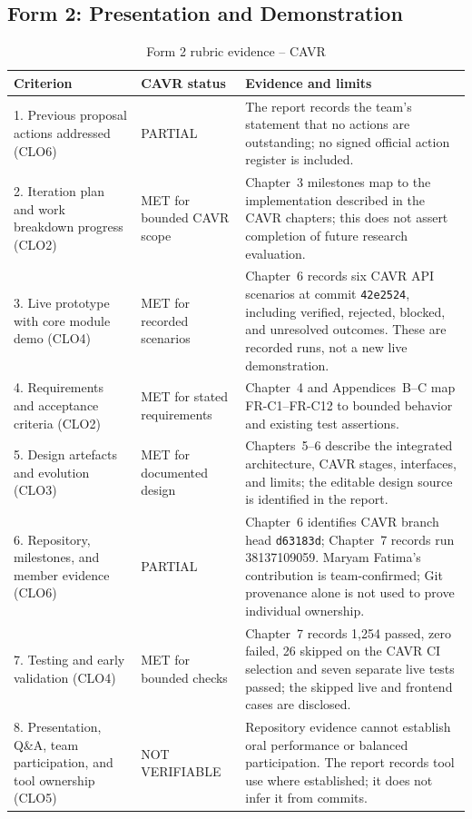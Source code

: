 \subsection{Form 2: Presentation and Demonstration}
\small
\begin{longtable}{p{}p{}p{}}
\caption{Form 2 rubric evidence -- CAVR}\\
\toprule
\textbf{Criterion} & \textbf{CAVR status} & \textbf{Evidence and limits}\\
\midrule
1. Previous proposal actions addressed (CLO6) & PARTIAL & The report records the team's statement that no actions are outstanding; no signed official action register is included.\\
2. Iteration plan and work breakdown progress (CLO2) & MET for bounded CAVR scope & Chapter~3 milestones map to the implementation described in the CAVR chapters; this does not assert completion of future research evaluation.\\
3. Live prototype with core module demo (CLO4) & MET for recorded scenarios & Chapter~6 records six CAVR API scenarios at commit \texttt{42e2524}, including verified, rejected, blocked, and unresolved outcomes. These are recorded runs, not a new live demonstration.\\
4. Requirements and acceptance criteria (CLO2) & MET for stated requirements & Chapter~4 and Appendices~B--C map FR-C1--FR-C12 to bounded behavior and existing test assertions.\\
5. Design artefacts and evolution (CLO3) & MET for documented design & Chapters~5--6 describe the integrated architecture, CAVR stages, interfaces, and limits; the editable design source is identified in the report.\\
6. Repository, milestones, and member evidence (CLO6) & PARTIAL & Chapter~6 identifies CAVR branch head \texttt{d63183d}; Chapter~7 records run 38137109059. Maryam Fatima's contribution is team-confirmed; Git provenance alone is not used to prove individual ownership.\\
7. Testing and early validation (CLO4) & MET for bounded checks & Chapter~7 records 1,254 passed, zero failed, 26 skipped on the CAVR CI selection and seven separate live tests passed; the skipped live and frontend cases are disclosed.\\
8. Presentation, Q\&A, team participation, and tool ownership (CLO5) & NOT VERIFIABLE & Repository evidence cannot establish oral performance or balanced participation. The report records tool use where established; it does not infer it from commits.\\
\bottomrule
\end{longtable}
\normalsize

